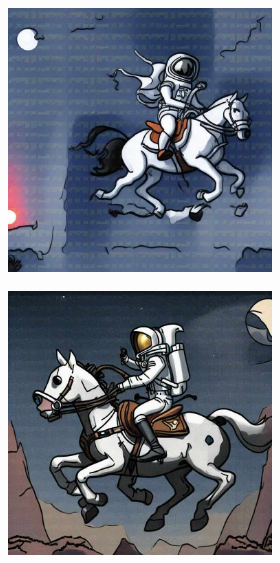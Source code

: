 \documentclass{article}
\begin{document}
\begin{figure}[h]
\begin{subfigure}[t]{\textwidth}
\begin{subfigure}[b]{0.19\textwidth}
         \includegraphics[width=\textwidth]{plots/process/generations/mist/none.jpeg}
     \end{subfigure}
     \hfill
     \begin{subfigure}[b]{0.19\textwidth}
         \centering

         \includegraphics[width=\textwidth]{plots/process/generations/mist/gaussian.jpeg}
     \end{subfigure}
     \hfill
     \begin{subfigure}[b]{0.19\textwidth}
         \centering


\end{subfigure}
\end{subfigure}
\end{figure}
\end{document}
